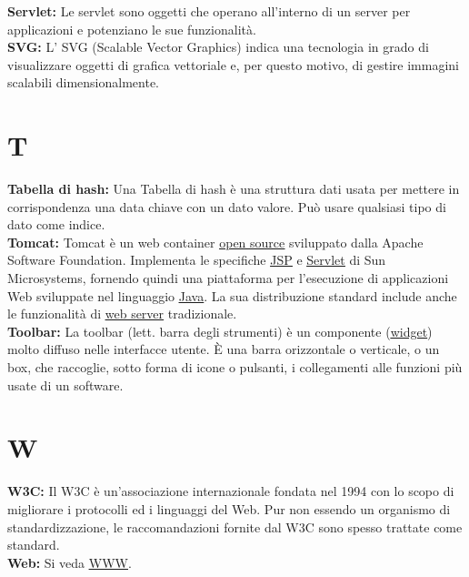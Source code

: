 \hypertarget{servlet}{}
\textbf{Servlet:}
Le servlet sono oggetti che operano all'interno di un server per applicazioni e potenziano le sue funzionalit\` a.\\

\hypertarget{svg}{}
\textbf{SVG:}
L' SVG (Scalable Vector Graphics) indica una tecnologia in grado di visualizzare oggetti di grafica vettoriale e, per questo motivo, di gestire immagini scalabili dimensionalmente.\\

\section*{T}
\hypertarget{tabhash}{}
\textbf{Tabella di hash:}
Una Tabella di hash \` e una struttura dati usata per mettere in corrispondenza una data chiave con un dato valore. Pu\` o usare qualsiasi tipo di dato come indice.\\

\hypertarget{tomcat}{}
\textbf{Tomcat:}
Tomcat \` e un web container \hyperlink{opensource}{\underline{open source}} sviluppato dalla Apache Software Foundation. Implementa le specifiche \hyperlink{jsp}{\underline{JSP}} e \hyperlink{servlet}{\underline{Servlet}} di Sun Microsystems, fornendo quindi una piattaforma per l'esecuzione di applicazioni Web sviluppate nel linguaggio \hyperlink{java}{\underline{Java}}. La sua distribuzione standard include anche le funzionalit\` a di \hyperlink{serverweb}{\underline{web server}} tradizionale.\\

\hypertarget{toolbar}{}
\textbf{Toolbar:}
La toolbar (lett. barra degli strumenti) \` e un componente (\hyperlink{widget}{\underline{widget}}) molto diffuso nelle interfacce utente. \` E una barra orizzontale o verticale, o un box, che raccoglie, sotto forma di icone o pulsanti, i collegamenti alle funzioni pi\` u usate di un software.\\


\section*{W}
\hypertarget{w3c}{}
\textbf{W3C:}
Il W3C \`e un'associazione internazionale fondata nel 1994 con lo scopo di migliorare i protocolli ed i linguaggi del Web. Pur non essendo un organismo di standardizzazione, le raccomandazioni fornite dal W3C sono spesso trattate come standard.\\

\hypertarget{web}{}
\textbf{Web:}
Si veda \hyperlink{www}{\underline{WWW}}.\\

